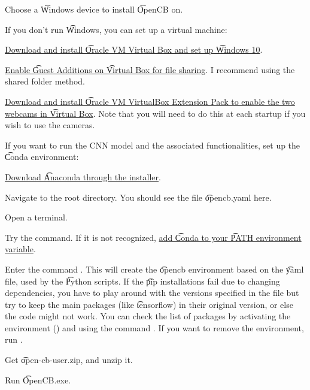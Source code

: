 \begin{enumeratenum}
    \item Choose a \t{Windows} device to install \t{OpenCB} on.
    \item If you don't run \t{Windows}, you can set up a virtual machine:
    \begin{enumeratenum}
        \item \href{https://www.youtube.com/watch?v=Y8rzZHscljQ}{Download and install \t{Oracle VM Virtual Box} and set up \t{Windows 10}}.
        \item \href{https://www.youtube.com/watch?v=HbLQnUVEHuE}{Enable \t{Guest Additions} on \t{Virtual Box} for file sharing}. I recommend using the shared folder method.
        \item \href{https://www.youtube.com/watch?v=90tB1nlP7ag}{Download and install \t{Oracle VM VirtualBox Extension Pack} to enable the two webcams in \t{Virtual Box}}. Note that you will need to do this at each startup if you wish to use the cameras.
    \end{enumeratenum}
    \item If you want to run the CNN model and the associated functionalities, set up the \t{Conda} environment:
    \begin{enumeratenum}
        \item \href{https://www.anaconda.com/download/success}{Download \t{Anaconda} through the installer}.
        \item Navigate to the root directory. You should see the file \t{opencb.yaml} here.
        \item Open a terminal.
        \item Try the  command. If it is not recognized, \href{https://stackoverflow.com/a/51996934/17694100}{add \t{Conda} to your \t{PATH} environment variable}. 
        \item Enter the command . This will create the \t{opencb} environment based on the \t{yaml} file, used by the \t{Python} scripts. If the \t{pip} installations fail due to changing dependencies, you have to play around with the versions specified in the file but try to keep the main packages (like \t{tensorflow}) in their original version, or else the code might not work. You can check the list of packages by activating the environment () and using the command . If you want to remove the environment, run .
    \end{enumeratenum}
    \item Get \t{open-cb-user.zip}, and unzip it.
    \item Run \t{OpenCB.exe}.
\end{enumeratenum}



